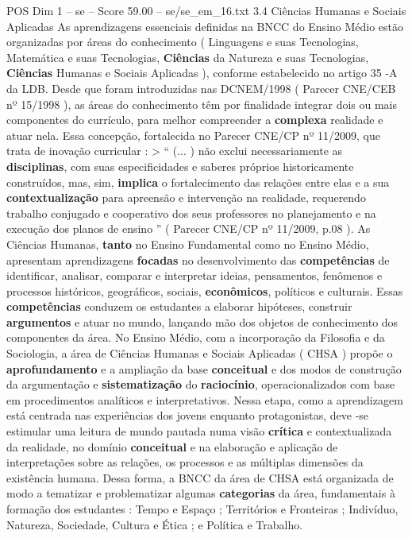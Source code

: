\begin{textsample}{POS Dim 1 – se – Score 59.00 – se/se\_em\_16.txt}  \label{ex:f1_pos_082}
3.4 Ciências Humanas e Sociais Aplicadas As aprendizagens essenciais definidas na BNCC do Ensino Médio estão organizadas por áreas do conhecimento ( Linguagens e suas Tecnologias, Matemática e suas Tecnologias, \textbf{Ciências} da Natureza e suas Tecnologias, \textbf{Ciências} Humanas e Sociais Aplicadas ), conforme estabelecido no artigo 35 -A da LDB.
Desde que foram introduzidas nas DCNEM/1998 ( Parecer CNE/CEB nº 15/1998 ), as áreas do conhecimento têm por finalidade integrar dois ou mais componentes do currículo, para melhor compreender a \textbf{complexa} realidade e atuar nela.
Essa concepção, fortalecida no Parecer CNE/CP nº 11/2009, que trata de inovação curricular : > “ (... ) não exclui necessariamente as \textbf{disciplinas}, com suas especificidades e saberes próprios historicamente construídos, mas, sim, \textbf{implica} o fortalecimento das relações entre elas e a sua \textbf{contextualização} para apreensão e intervenção na realidade, requerendo trabalho conjugado e cooperativo dos seus professores no planejamento e na execução dos planos de ensino ” ( Parecer CNE/CP nº 11/2009, p.08 ).
As Ciências Humanas, \textbf{tanto} no Ensino Fundamental como no Ensino Médio, apresentam aprendizagens \textbf{focadas} no desenvolvimento das \textbf{competências} de identificar, analisar, comparar e interpretar ideias, pensamentos, fenômenos e processos históricos, geográficos, sociais, \textbf{econômicos}, políticos e culturais.
Essas \textbf{competências} conduzem os estudantes a elaborar hipóteses, construir \textbf{argumentos} e atuar no mundo, lançando mão dos objetos de conhecimento dos componentes da área.
No Ensino Médio, com a incorporação da Filosofia e da Sociologia, a área de Ciências Humanas e Sociais Aplicadas ( CHSA ) propõe o \textbf{aprofundamento} e a ampliação da base \textbf{conceitual} e dos modos de construção da argumentação e \textbf{sistematização} do \textbf{raciocínio}, operacionalizados com base em procedimentos analíticos e interpretativos.
Nessa etapa, como a aprendizagem está centrada nas experiências dos jovens enquanto protagonistas, deve -se estimular uma leitura de mundo pautada numa visão \textbf{crítica} e contextualizada da realidade, no domínio \textbf{conceitual} e na elaboração e aplicação de interpretações sobre as relações, os processos e as múltiplas dimensões da existência humana.
Dessa forma, a BNCC da área de CHSA está organizada de modo a tematizar e problematizar algumas \textbf{categorias} da área, fundamentais à formação dos estudantes : Tempo e Espaço ; Territórios e Fronteiras ; Indivíduo, Natureza, Sociedade, Cultura e Ética ; e Política e Trabalho.

\end{textsample}
